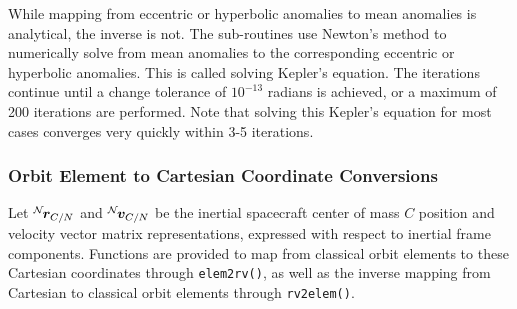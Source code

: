 While mapping from eccentric or hyperbolic anomalies to mean anomalies is analytical, the inverse is not.  The sub-routines use Newton's method to numerically solve from mean anomalies to the corresponding eccentric or hyperbolic anomalies.  This is called solving Kepler's equation.  The iterations continue until a change tolerance of $10^{-13}$ radians is achieved, or a maximum of 200 iterations are performed.  Note that solving this Kepler's equation for most cases converges very quickly within 3-5 iterations.  




\subsubsection{Orbit Element to Cartesian Coordinate Conversions}
Let $\leftexp{N}{\bm r}_{C/N}$ and $\leftexp{N}{\bm v}_{C/N}$ be the inertial spacecraft center of mass $C$ position and velocity vector matrix representations, expressed with respect to inertial frame  components.  Functions are provided to map from classical orbit elements to these Cartesian coordinates through {\tt elem2rv()}, as well as the inverse mapping from Cartesian to classical orbit elements through {\tt rv2elem()}.  

